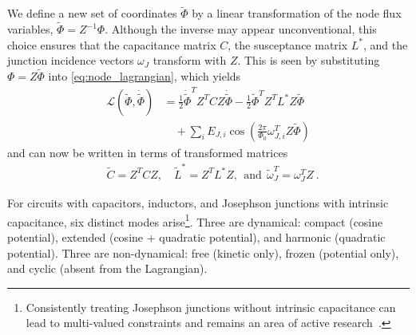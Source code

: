 We define a new set of coordinates $\tilde{\Phi}$ by a linear transformation of the node flux variables,
$\tilde{\Phi} = Z^{-1}\Phi$.
Although the inverse may appear unconventional, this choice ensures that the capacitance matrix $C$, the susceptance matrix $L^*$, and the junction incidence vectors $\omega_J$ transform with $Z$. This is seen by substituting $\Phi = Z\tilde{\Phi}$ into \cref{eq:node_lagrangian}, which yields
\begin{align}\label{eq:tilde_lagrangian}
    \mathcal{L}(\tilde \Phi, \dot{\tilde\Phi}) &= \frac{1}{2}\dot{\tilde\Phi}^TZ^TCZ\dot{\tilde\Phi} - \frac{1}{2}\tilde \Phi^TZ^T L^*Z\tilde \Phi  \nonumber \\ & \quad + \sum_iE_{J,i}\cos\left(\frac{2\pi}{\Phi_0}\omega_{J,i}^T Z \tilde \Phi\right)
\end{align}
and can now be written in terms of transformed matrices
\begin{align}
    &\tilde C = Z^TCZ, \quad \tilde{L}^* = Z^TL^*Z, ~~\textrm{and}~~ \tilde \omega_J^T = \omega_J^T Z ~.
\end{align}


For circuits with capacitors, inductors, and Josephson junctions with intrinsic capacitance, six distinct modes arise\footnote{Consistently treating Josephson junctions without intrinsic capacitance can lead to multi-valued constraints and remains an area of active research~\cite{rymarz_consistent_2023, Eguisquiz_Reply_Consistent_2025, Eguisquiz_Comment_Consistent_2025}.}. Three are dynamical: compact (cosine potential), extended (cosine + quadratic potential), and harmonic (quadratic potential). Three are non-dynamical: free (kinetic only), frozen (potential only), and cyclic (absent from the Lagrangian).

